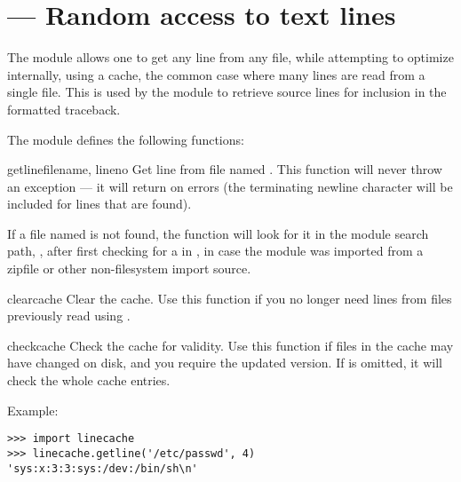 \section{ ---
         Random access to text lines}



The  module allows one to get any line from any file,
while attempting to optimize internally, using a cache, the common case
where many lines are read from a single file.  This is used by the
 module to retrieve source lines for inclusion in 
the formatted traceback.

The  module defines the following functions:

\begin{funcdesc}{getline}{filename, lineno}
Get line  from file named . This function
will never throw an exception --- it will return  on errors
(the terminating newline character will be included for lines that are
found).

If a file named  is not found, the function will look
for it in the module search path,
, after first checking for a  
in , in case the module was imported from a zipfile
or other non-filesystem import source. 

\end{funcdesc}

\begin{funcdesc}{clearcache}{}
Clear the cache.  Use this function if you no longer need lines from
files previously read using .
\end{funcdesc}

\begin{funcdesc}{checkcache}{}
Check the cache for validity.  Use this function if files in the cache 
may have changed on disk, and you require the updated version.  If
 is omitted, it will check the whole cache entries.
\end{funcdesc}

Example:

\begin{verbatim}
>>> import linecache
>>> linecache.getline('/etc/passwd', 4)
'sys:x:3:3:sys:/dev:/bin/sh\n'
\end{verbatim}
